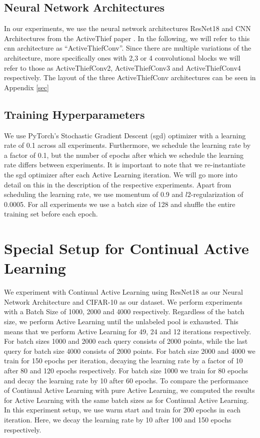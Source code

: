 \subsection{Neural Network Architectures}
\label{sec:ExperimentSetup:NNArchitectures}
In our experiments, we use the neural network architectures ResNet18 \cite{he2016deep} and CNN Architectures from the ActiveThief paper \cite{pal2020activethief}.
In the following, we will refer to this \gls{cnn} architecture as \enquote{ActiveThiefConv}. Since there are multiple variations of the architecture, more specifically ones with
2,3 or 4 convolutional blocks we will refer to those as ActiveThiefConv2, ActiveThiefConv3 and ActiveThiefConv4 respectively. The layout of the three ActiveThiefConv architectures
can be seen in Appendix \ref{sec}


\subsection{Training Hyperparameters}
\label{sec:ExperimentSetup:Hyperparameters}
We use PyTorch's Stochastic Gradient Descent (\gls{sgd}) optimizer with a learning rate of 0.1 across all experiments. Furthermore, we schedule the learning rate by a factor of 0.1, but the number of
epochs after which we schedule the learning rate differs between experiments. It is important to note that we re-instantiate the \gls{sgd} optimizer after each Active Learning
iteration. We will go more into detail on this in the description of the respective experiments. Apart from scheduling the learning rate, we use momentum \cite{cutkosky2020momentum}
of 0.9 and $l2$-regularization of 0.0005. For all experiments we use a batch size of 128 and shuffle the entire training set before each epoch.


\section{Special Setup for Continual Active Learning}
\label{sec:Methodology:CALsetup}
We experiment with Continual Active Learning using ResNet18 as our Neural Network Architecture and CIFAR-10 as our dataset. We perform experiments with a Batch Size of 1000,
2000 and 4000 respectively. Regardless of the batch size, we perform Active Learning until the unlabeled pool is exhausted. This means that we perform Active Learning for
49, 24 and 12 iterations respectively. For batch sizes 1000 and 2000 each query consists of 2000 points, while the last query for batch size 4000 consists of 2000 points.
For batch size 2000 and 4000 we train for 150 epochs per iteration, decaying the learning rate by a factor of 10 after 80 and 120 epochs respectively. For batch size 1000 we
train for 80 epochs and decay the learning rate by 10 after 60 epochs. To compare the performance of Continual Active Learning with pure Active Learning, we computed the results
for Active Learning with the same batch sizes as for Continual Active Learning. In this experiment setup, we use warm start and train for 200 epochs in each iteration. Here, we
decay the learning rate by 10 after 100 and 150 epochs respectively.

